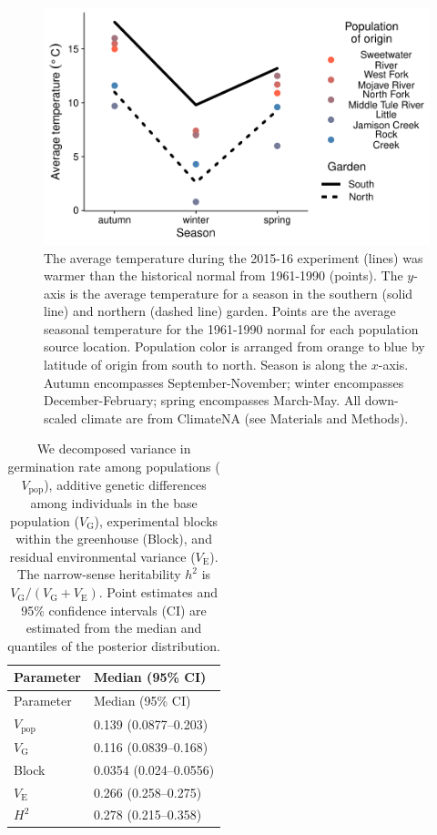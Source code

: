 \documentclass[
  12pt,
]{article}
\begin{document}
\begin{figure}[ht]
  \includegraphics[width=\textwidth]{figures/climate.pdf}
  \caption{The average temperature during the 2015-16 experiment (lines) was warmer than the historical normal from 1961-1990 (points). The $y$-axis is the average temperature for a season in the southern (solid line) and northern (dashed line) garden. Points are the average seasonal temperature for the 1961-1990 normal for each population source location. Population color is arranged from orange to blue by latitude of origin from south to north. Season is along the $x$-axis. Autumn encompasses September-November; winter encompasses December-February; spring encompasses March-May. All down-scaled climate are from ClimateNA (see Materials and Methods).}
  \label{fig:fig:climate}
\end{figure}

\clearpage

\begin{longtable}[]{@{}ll@{}}
\caption{\label{tab:vc_table_germ} We decomposed variance in germination rate among populations (\(V_\text{pop}\)), additive genetic differences among individuals in the base population (\(V_\text{G}\)), experimental blocks within the greenhouse (Block), and residual environmental variance (\(V_\text{E}\)). The narrow-sense heritability \(h^2\) is \(V_\text{G} / (V_\text{G} + V_\text{E})\). Point estimates and 95\% confidence intervals (CI) are estimated from the median and quantiles of the posterior distribution.}\tabularnewline
\toprule
Parameter & Median (95\% CI) \\
\midrule
\endfirsthead
\toprule
Parameter & Median (95\% CI) \\
\midrule
\endhead
\(V_\text{pop}\) & 0.139 (0.0877--0.203) \\
\(V_\text{G}\) & 0.116 (0.0839--0.168) \\
Block & 0.0354 (0.024--0.0556) \\
\(V_\text{E}\) & 0.266 (0.258--0.275) \\
\(H^2\) & 0.278 (0.215--0.358) \\
\bottomrule
\end{longtable}
\end{document}
